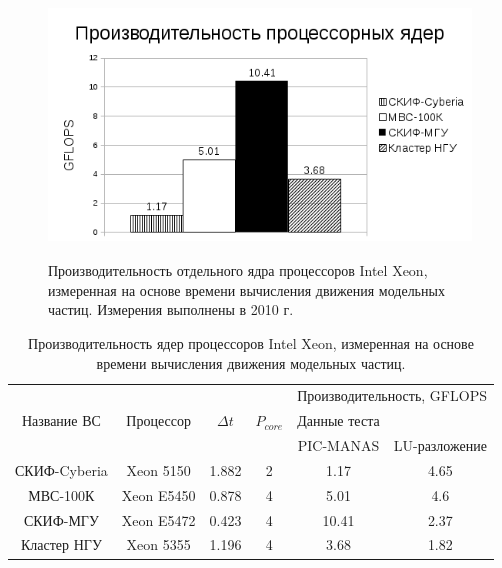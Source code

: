\begin{figure}[htb]
	\begin{center}
		\includegraphics[height=7cm,keepaspectratio]{images/processor_FLOPS_PIC.png}
	\end{center}
	\caption{Производительность отдельного ядра процессоров Intel Xeon, измеренная на основе времени вычисления движения модельных частиц. Измерения выполнены в 2010 г.}
	\label{procs_flops_pic}
\end{figure} 


\begin{table}[ht]
	\caption{Производительность ядер процессоров Intel Xeon, измеренная на основе времени вычисления движения модельных частиц.}
	\label{PIC_vs_LU}
	\begin{tabular}{|c|c|c|c|c|c|}
		\hline
		&            &            &             &       \multicolumn{2}{|c|}{Производительность, GFLOPS} \\ \cline{5-6}  	
		Название ВС  & Процессор  &  $\Delta t$ &$P_{core}$ & Данные теста  &  \\
		             &            &             &           & PIC-MANAS     & LU-разложение \\ \hline
		СКИФ-Cyberia & Xeon 5150  &  1.882      & 2     &  1.17          & 4.65    \\ \hline
		МВС-100К     & Xeon E5450 &  0.878      & 4     & 5.01           & 4.6     \\ \hline 
		СКИФ-МГУ     & Xeon E5472 &  0.423      & 4     & 10.41          & 2.37       \\ \hline     
		Кластер НГУ  & Xeon 5355  &  1.196      & 4     & 3.68           & 1.82       \\ \hline
	\end{tabular}	
\end{table}






